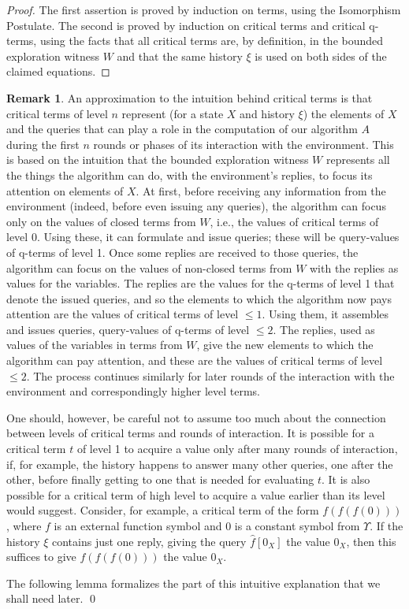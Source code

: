 \documentclass{LMCS}
\theoremstyle{definition}
\newtheorem{rmk}[thm]{Remark}
\newcommand{\U}{\Upsilon}
\begin{document}
\begin{proof}
  The first assertion is proved by induction on terms, using the
  Isomorphism Postulate.  The second is proved by induction on
  critical terms and critical q-terms, using the facts that all
  critical terms are, by definition, in the bounded exploration
  witness $W$ and that the same history $\xi$ is used on both sides of
  the claimed equations.
\end{proof}

\begin{rmk}
An approximation to the intuition behind critical terms is that critical
terms of level $n$ represent (for a state $X$ and history $\xi$) the
elements of $X$ and the queries that can play a role in the computation of
our algorithm $A$ during the first $n$ rounds or phases of its interaction
with the environment.  This is based on the intuition that the bounded
exploration witness $W$ represents all the things the algorithm can do,
with the environment's replies, to focus its attention on elements of $X$.
At first, before receiving any information from the environment (indeed,
before even issuing any queries), the algorithm can focus only on the
values of closed terms from $W$, i.e., the values of critical terms of
level 0.  Using these, it can formulate and issue queries; these will be
query-values of q-terms of level 1.  Once some replies are received to
those queries, the algorithm can focus on the values of non-closed terms
from $W$ with the replies as values for the variables.  The replies are
the values for the q-terms of level 1 that denote the issued queries, and
so the elements to which the algorithm now pays attention are the values
of critical terms of level $\leq1$.  Using them, it assembles and issues
queries, query-values of q-terms of level $\leq2$. The replies, used as
values of the variables in terms from $W$, give the new elements to which
the algorithm can pay attention, and these are the values of critical
terms of level $\leq2$.  The process continues similarly for later rounds
of the interaction with the environment and correspondingly higher level
terms.

One should, however, be careful not to assume too much about the
connection between levels of critical terms and rounds of
interaction. It is possible for a critical term $t$ of level 1 to
acquire a value only after many rounds of interaction, if, for
example, the history happens to answer many other queries, one after
the other, before finally getting to one that is needed for evaluating
$t$.  It is also possible for a critical term of high level to acquire
a value earlier than its level would suggest. Consider, for example, a
critical term of the form $f(f(f(0)))$, where $f$ is an external
function symbol and 0 is a constant symbol from $\U$.  If the
history $\xi$ contains just one reply, giving the query $\hat f[0_X]$
the value $0_X$, then this suffices to give $f(f(f(0)))$ the value
$0_X$.

The following lemma formalizes the part of this intuitive explanation
that we shall need later.
\qed\end{rmk}
\end{document}

